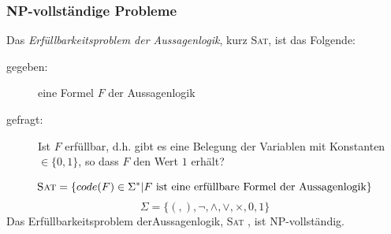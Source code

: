 \documentclass{scrartcl}
\begin{document}
\subsubsection*{\textsf{NP}-vollständige Probleme}
\begin{shaded}
    Das \emph{Erfüllbarkeitsproblem der Aussagenlogik}, kurz \textsc{Sat}, ist das Folgende:
    \begin{description}
        \item[gegeben:] eine Formel $F$ der Aussagenlogik
        \item[gefragt:] Ist $F$ erfüllbar, d.h. gibt es eine Belegung der Variablen mit Konstanten $\in\{0,1\}$, so dass $F$ den Wert $1$ erhält?
    \end{description}
    \[\textsc{Sat}=\{code(F)\in\Sigma^* | F \textrm{ ist eine erfüllbare Formel der Aussagenlogik} \}\]
    \[\Sigma=\{(,),\neg, \wedge,\vee,\times,0,1 \} \]
    Das Erfüllbarkeitsproblem derAussagenlogik, \textsc{Sat} , ist \textsf{NP}-vollständig.

\end{shaded}

\begin{center}
\scalebox{.75}{}
\end{center}
\end{document}
